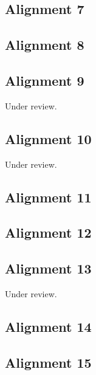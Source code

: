 \documentclass{scrartcl}
\begin{document}
\subsection{Alignment 7} %
\label{sec:align_7}
\clearpage

\subsection{Alignment 8} %
\label{sec:align_8}
\clearpage

\subsection{Alignment 9} %
\label{sec:align_9}
Under review.%
\clearpage

\subsection{Alignment 10} %
\label{sec:align_10}
Under review.%
\clearpage

\subsection{Alignment 11} %
\label{sec:align_11}
\clearpage

\subsection{Alignment 12} %
\label{sec:align_12}
\clearpage

\subsection{Alignment 13} %
\label{sec:align_13}
Under review.%
\clearpage

\subsection{Alignment 14} %
\label{sec:align_14}
\clearpage

\subsection{Alignment 15} %
\label{sec:align_15}
\clearpage
\end{document}
